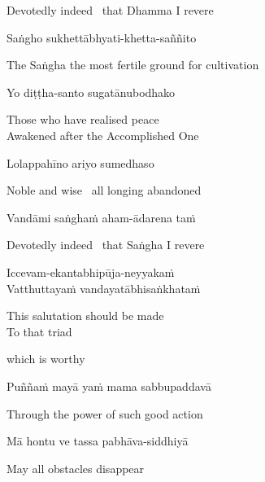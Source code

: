 \begin{english}
  Devotedly indeed \breathmark\ that Dhamma I revere
\end{english}

Saṅgho sukhettābhyati-khetta-saññito

\begin{english}
  The Saṅgha the most fertile ground for cultivation
\end{english}

Yo diṭṭha-santo sugatānubodhako

\begin{english}
  Those who have realised peace\\
  Awakened after the Accomplished One
\end{english}

Lolappahīno ariyo sumedhaso

\begin{english}
  Noble and wise \breathmark\ all longing abandoned
\end{english}

Vandāmi saṅghaṁ aham-ādarena taṁ

\begin{english}
  Devotedly indeed \breathmark\ that Saṅgha I revere
\end{english}

  Iccevam-ekantabhipūja-neyyakaṁ\\
  Vatthuttayaṁ vandayatābhisaṅkhataṁ

\begin{english}
    This salutation should be made\\
  To that triad\makeatletter\hyperlink{endnote11-appendix}\makeatother

  which is worthy
\end{english}

Puññaṁ mayā yaṁ mama sabbupaddavā

\begin{english}
  Through the power of such good action
\end{english}

Mā hontu ve tassa pabhāva-siddhiyā

\begin{english}
  May all obstacles disappear
\end{english}


